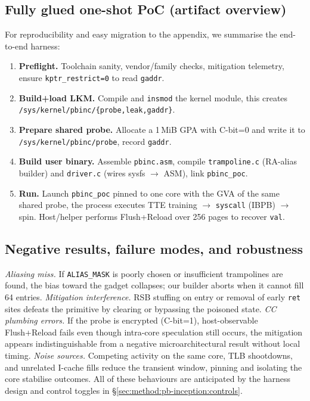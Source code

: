 \documentclass[11pt,a4paper]{article}
\begin{document}
\vspace{-0.5em}

\subsection{Fully glued one-shot PoC (artifact overview)}
For reproducibility and easy migration to the appendix, we summarise the end-to-end harness:

\begin{enumerate}
  \item \textbf{Preflight.} Toolchain sanity, vendor/family checks, mitigation telemetry, ensure \texttt{kptr\_restrict=0} to read \texttt{gaddr}.\cite{linux_srso_doc}
  \item \textbf{Build+load LKM.} Compile and \texttt{insmod} the kernel module, this creates\\ \texttt{/sys/kernel/pbinc/\{probe,leak,gaddr\}}.\cite{wikner2025breaking}
  \item \textbf{Prepare shared probe.} Allocate a 1\,MiB GPA with C-bit=0 and write it to \texttt{/sys/kernel/pbinc/probe}, record \texttt{gaddr}.\cite{wikner2025breaking}
  \item \textbf{Build user binary.} Assemble \texttt{pbinc.asm}, compile \texttt{trampoline.c} (RA-alias builder) and \texttt{driver.c} (wires sysfs $\rightarrow$ ASM), link \texttt{pbinc\_poc}.\cite{wikner2025breaking}
  \item \textbf{Run.} Launch \texttt{pbinc\_poc} pinned to one core with the GVA of the same shared probe, the process executes TTE training $\rightarrow$ \texttt{syscall} (IBPB) $\rightarrow$ spin. Host/helper performs Flush+Reload over 256 pages to recover \texttt{val}.\cite{wikner2025breaking}
\end{enumerate}

\subsection{Negative results, failure modes, and robustness}
\emph{Aliasing miss.} If \texttt{ALIAS\_MASK} is poorly chosen or insufficient trampolines are found, the bias toward the gadget collapses; our builder aborts when it cannot fill 64 entries.  
\emph{Mitigation interference.} RSB stuffing on entry or removal of early \texttt{ret} sites defeats the primitive by clearing or bypassing the poisoned state.  
\emph{CC plumbing errors.} If the probe is encrypted (C-bit=1), host-observable Flush+Reload fails even though intra-core speculation still occurs, the mitigation appears indistinguishable from a negative microarchitectural result without local timing.  
\emph{Noise sources.} Competing activity on the same core, TLB shootdowns, and unrelated I-cache fills reduce the transient window, pinning and isolating the core stabilise outcomes. All of these behaviours are anticipated by the harness design and control toggles in \S\ref{sec:method:pb-inception:controls}.\cite{linux_srso_doc,linux_rsb_doc,wikner2025breaking}
\end{document}

